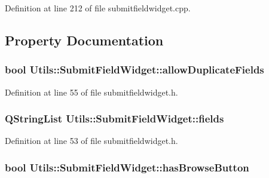 \-Definition at line 212 of file submitfieldwidget.\-cpp.



\subsection{\-Property \-Documentation}
\hypertarget{class_utils_1_1_submit_field_widget_a7d0928a7bb510f65441ec97e3cc1d14d}{
\subsubsection[{allow\-Duplicate\-Fields}]{\setlength{\rightskip}{0pt plus 5cm}bool {\bf \-Utils\-::\-Submit\-Field\-Widget\-::allow\-Duplicate\-Fields}}}\label{class_utils_1_1_submit_field_widget_a7d0928a7bb510f65441ec97e3cc1d14d}


\-Definition at line 55 of file submitfieldwidget.\-h.

\hypertarget{class_utils_1_1_submit_field_widget_a703b2271bfd9dce841ff482a1c787da8}{
\subsubsection[{fields}]{\setlength{\rightskip}{0pt plus 5cm}\-Q\-String\-List {\bf \-Utils\-::\-Submit\-Field\-Widget\-::fields}}}\label{class_utils_1_1_submit_field_widget_a703b2271bfd9dce841ff482a1c787da8}


\-Definition at line 53 of file submitfieldwidget.\-h.

\hypertarget{class_utils_1_1_submit_field_widget_abf83b3fe4fc7040c43e27b77f77ac6a6}{
\subsubsection[{has\-Browse\-Button}]{\setlength{\rightskip}{0pt plus 5cm}bool {\bf \-Utils\-::\-Submit\-Field\-Widget\-::has\-Browse\-Button}}}\label{class_utils_1_1_submit_field_widget_abf83b3fe4fc7040c43e27b77f77ac6a6}


